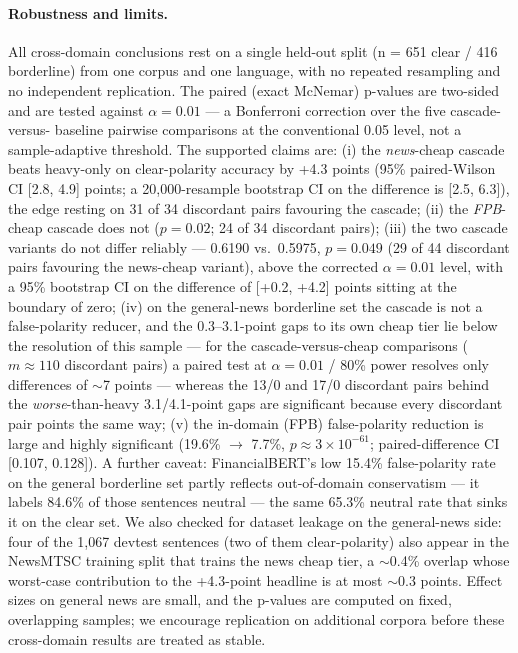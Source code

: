 \documentclass{article}
\begin{document}
\paragraph{Robustness and limits.} All cross-domain conclusions rest on a
single held-out split (n = 651 clear / 416 borderline) from one corpus and one
language, with no repeated resampling and no independent replication. The
paired (exact McNemar) p-values are two-sided and are tested against
$\alpha = 0.01$ --- a Bonferroni correction over the five cascade-versus-
baseline pairwise comparisons at the conventional 0.05 level, not a
sample-adaptive threshold. The supported claims
are: (i) the \emph{news}-cheap cascade beats heavy-only on clear-polarity
accuracy by +4.3 points (95\% paired-Wilson CI [2.8, 4.9] points; a 20{,}000-resample
bootstrap CI on the difference is [2.5, 6.3]), the edge resting on 31 of 34
discordant pairs favouring the cascade; (ii) the \emph{FPB}-cheap
cascade does not ($p = 0.02$; 24 of 34 discordant pairs); (iii) the two cascade
variants do not differ reliably --- 0.6190 vs.\ 0.5975, $p = 0.049$ (29 of 44
discordant pairs favouring the news-cheap variant), above the corrected
$\alpha = 0.01$ level, with a 95\% bootstrap CI on the difference of
[+0.2, +4.2] points sitting at the boundary of zero; (iv) on the
general-news borderline set the cascade is not a false-polarity reducer, and
the 0.3--3.1-point gaps to its own cheap tier lie below the resolution of this
sample --- for the cascade-versus-cheap comparisons ($m \approx 110$ discordant
pairs) a paired test at $\alpha = 0.01$ / 80\% power resolves only
differences of $\sim$7 points --- whereas the 13/0 and 17/0 discordant
pairs behind the \emph{worse}-than-heavy 3.1/4.1-point gaps are significant
because every discordant pair points the same way; (v) the in-domain (FPB)
false-polarity reduction is large and highly significant (19.6\% $\to$ 7.7\%,
$p \approx 3\times10^{-61}$; paired-difference CI [0.107, 0.128]). A further
caveat: FinancialBERT's low 15.4\% false-polarity rate on the general
borderline set partly reflects out-of-domain conservatism --- it labels 84.6\%
of those sentences neutral --- the same 65.3\% neutral rate that sinks it on
the clear set. We also checked for dataset leakage on the general-news side:
four of the 1,067 devtest sentences (two of them clear-polarity) also appear in
the NewsMTSC training split that trains the news cheap tier, a $\sim$0.4\%
overlap whose worst-case contribution to the +4.3-point headline is at most
$\sim$0.3 points. Effect sizes on general news are small, and the p-values are
computed on fixed, overlapping samples; we encourage replication on additional
corpora before these cross-domain results are treated as stable.
\end{document}
